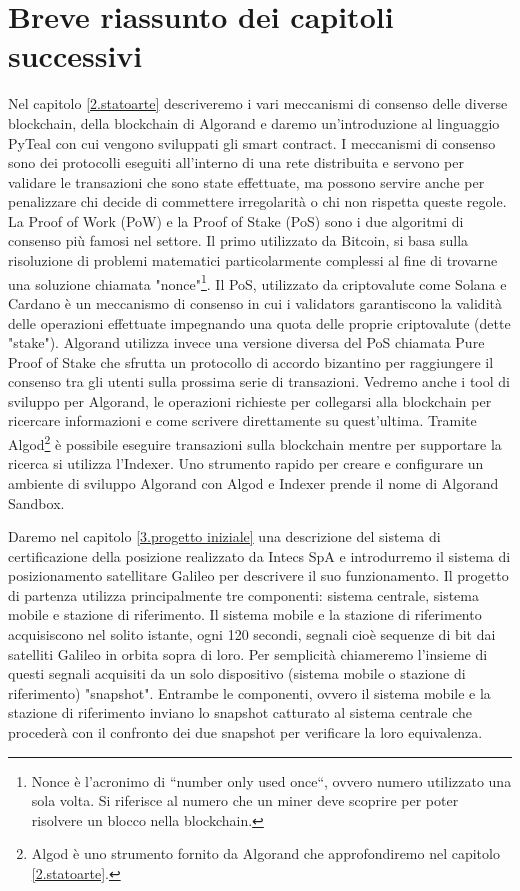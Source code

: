 \section{Breve riassunto dei capitoli successivi}
Nel capitolo \ref{2.statoarte} descriveremo i vari meccanismi di consenso delle diverse blockchain, della blockchain di Algorand e daremo un'introduzione al linguaggio PyTeal con cui vengono sviluppati gli smart contract. I meccanismi di consenso sono dei protocolli eseguiti all'interno di una rete distribuita e servono per validare le transazioni che sono state effettuate, ma possono servire anche per penalizzare chi decide di commettere irregolarità o chi non rispetta queste regole. La Proof of Work (PoW) e la Proof of Stake (PoS) sono i due algoritmi di consenso più famosi nel settore. Il primo utilizzato da Bitcoin, si basa sulla risoluzione di problemi matematici particolarmente complessi al fine di trovarne una soluzione chiamata "nonce"\footnote{Nonce è l’acronimo di “number only used once“, ovvero numero utilizzato una sola volta. Si riferisce al numero che un miner deve scoprire per poter risolvere un blocco nella blockchain.}. Il PoS, utilizzato da criptovalute come Solana e Cardano è un meccanismo di consenso in cui i validators garantiscono la validità delle operazioni effettuate impegnando una quota delle proprie criptovalute (dette "stake"). Algorand utilizza invece una versione diversa del PoS chiamata Pure Proof of Stake che sfrutta un protocollo di accordo bizantino per raggiungere il consenso tra gli utenti sulla prossima serie di transazioni. Vedremo anche i tool di sviluppo per Algorand, le operazioni richieste per collegarsi alla blockchain per ricercare informazioni e come scrivere direttamente su quest’ultima. Tramite Algod\footnote{Algod è uno strumento fornito da Algorand che approfondiremo nel capitolo \ref{2.statoarte}.} è possibile eseguire transazioni sulla blockchain mentre per supportare la ricerca si utilizza l'Indexer. Uno strumento rapido per creare e configurare un ambiente di sviluppo Algorand con Algod e Indexer prende il nome di Algorand Sandbox.

Daremo nel capitolo \ref{3.progetto iniziale} una descrizione del sistema di certificazione della posizione realizzato da Intecs SpA e introdurremo il sistema di posizionamento satellitare Galileo\cite{de2001galileo} per descrivere il suo funzionamento. Il progetto di partenza utilizza principalmente tre componenti: sistema centrale, sistema mobile e stazione di riferimento. Il sistema mobile e la stazione di riferimento acquisiscono nel solito istante, ogni 120 secondi, segnali cioè sequenze di bit dai satelliti Galileo in orbita sopra di loro. Per semplicità chiameremo l'insieme di questi segnali acquisiti da un solo dispositivo (sistema mobile o stazione di riferimento) "snapshot". Entrambe le componenti, ovvero il sistema mobile e la stazione di riferimento inviano lo snapshot catturato al sistema centrale che procederà con il confronto dei due snapshot per verificare la loro equivalenza.


